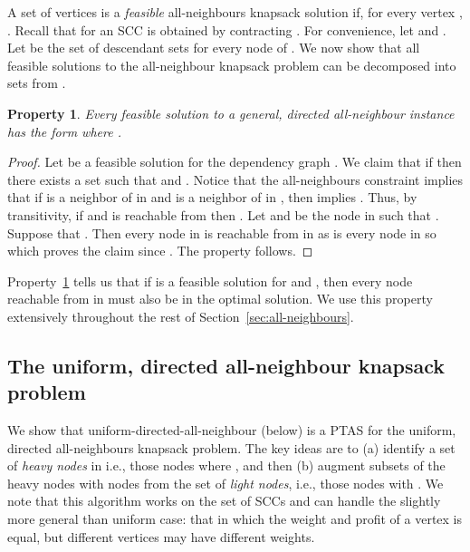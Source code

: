 \documentclass[12pt]{article}
\newtheorem{property}[theorem]{Property}
\begin{document}
A set of vertices  is a {\em feasible} all-neighbours knapsack
solution if, for every vertex , .  Recall
that for an SCC  is obtained by contracting
.  For convenience, let  and
.  Let  be the set of descendant sets for every node of
.  We now show that all feasible solutions to the
all-neighbour knapsack problem can be decomposed into sets from
.

\begin{property} \label{prop:all-neighbours}
Every feasible solution to a general, directed all-neighbour instance has the form  where .
\end{property}

\begin{proof}
Let  be a feasible solution for the dependency graph .  We claim
that if  then there exists a set  such
that  and .  Notice that the
all-neighbours constraint implies that if  is a neighbor of  in
 and  is a neighbor of  in , then  implies .  Thus, by transitivity, if  and  is reachable from 
then .  Let  and  be the node in 
such that .  Suppose that .
Then every node in  is reachable from  in  as is every
node in  so  which proves the claim since .  The property follows.
\end{proof}

Property~\ref{prop:all-neighbours} tells us that if  is a feasible solution for  and , then every node reachable from  in  must also be in the optimal solution.  We use this property extensively throughout the rest of Section~\ref{sec:all-neighbours}.

\subsection{The uniform, directed all-neighbour knapsack problem}

We show that {\sc uniform-directed-all-neighbour} (below) is a
PTAS for the uniform, directed all-neighbours knapsack problem.  The
key ideas are to (a) identify a set  of {\em heavy nodes} in  i.e., those nodes  where ,
and then (b) augment subsets of the heavy nodes with nodes from
the set  of {\em light nodes}, i.e., those nodes  with .  We note that this algorithm works on the set of SCCs and
can handle the slightly more general than uniform case: that in which
the weight and profit of a vertex is equal, but different vertices may
have different weights.
\end{document}

